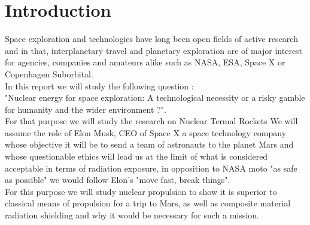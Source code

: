 \documentclass[12pt,a4paper]{report}
\author{S. Bourgeois}
\begin{document}
%


\pagestyle{fancy}

\fancyhead{} %
\fancyfoot{} %
\fancyfoot[C]{\thepage}





\tableofcontents


\chapter*{Introduction}


\quad Space exploration and technologies have long been open fields of active research and in that, interplanetary travel and planetary exploration are of major interest for agencies, companies and amateurs alike such as NASA, ESA, Space X or Copenhagen Suborbital.\\


In this report we will study the following question : \\
"Nuclear energy for space exploration: A technological necessity or a risky gamble for humanity and the wider environment ?".\\

For that purpose we will study the research on Nuclear Termal Rockets
We will assume the role of Elon Musk, CEO of Space X a space technology company whose objective it will be to send a team of astronauts to the planet Mars and whose questionable ethics will lead us at the limit of what is considered acceptable in terms of radiation exposure, in opposition to NASA moto "as safe as possible" we would follow Elon's "move fast, break things".\\
For this purpose we will study nuclear propulsion to show it is superior to classical means of propulsion for a trip to Mars, as well as composite material radiation shielding and why it would be necessary for such a mission.\\
\end{document}
